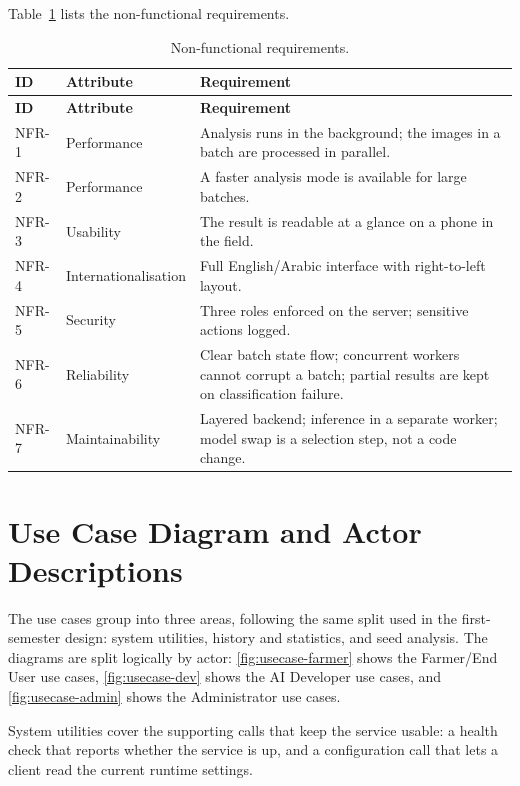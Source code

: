 Table~\ref{tab:ch3-nfr} lists the non-functional requirements.

\begin{singlespace}
\begin{longtable}{@{}p{1.5cm}p{2.8cm}p{7.2cm}@{}}
\caption{Non-functional requirements.}
\label{tab:ch3-nfr} \\
\toprule
\textbf{ID} & \textbf{Attribute} & \textbf{Requirement} \\
\midrule
\endfirsthead
\toprule
\textbf{ID} & \textbf{Attribute} & \textbf{Requirement} \\
\midrule
\endhead
\bottomrule
\endfoot
\bottomrule
\endlastfoot
NFR-1 & Performance & Analysis runs in the background; the images in a batch are processed in parallel. \\
NFR-2 & Performance & A faster analysis mode is available for large batches. \\
NFR-3 & Usability & The result is readable at a glance on a phone in the field. \\
NFR-4 & Internationalisation & Full English/Arabic interface with right-to-left layout. \\
NFR-5 & Security & Three roles enforced on the server; sensitive actions logged. \\
NFR-6 & Reliability & Clear batch state flow; concurrent workers cannot corrupt a batch; partial results are kept on classification failure. \\
NFR-7 & Maintainability & Layered backend; inference in a separate worker; model swap is a selection step, not a code change. \\
\end{longtable}
\end{singlespace}

\section{Use Case Diagram and Actor Descriptions}

The use cases group into three areas, following the same split used in the
first-semester design: system utilities, history and statistics, and seed
analysis. The diagrams are split logically by actor: \autoref{fig:usecase-farmer}
shows the Farmer/End User use cases, \autoref{fig:usecase-dev} shows the AI Developer
use cases, and \autoref{fig:usecase-admin} shows the Administrator use cases.

System utilities cover the supporting calls that keep the service usable: a health
check that reports whether the service is up, and a configuration call that lets a
client read the current runtime settings.

